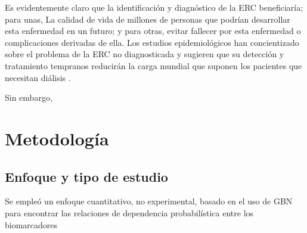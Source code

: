 \documentclass{Academic}
\begin{document}
Es evidentemente claro que la identificación y diagnóstico de la ERC beneficiaría; para unas, 
La calidad de vida de millones de personas que podrían desarrollar esta enfermedad en un 
futuro; y para otras, evitar fallecer por esta enfermedad o complicaciones derivadas de ella. 
Los estudios epidemiológicos han concientizado sobre el problema de la ERC no 
diagnosticada y sugieren que su detección y tratamiento tempranos reducirán
la carga mundial que suponen los pacientes que necesitan diálisis \cite{Taal}.

Sin embargo,


\section{Metodología}

\subsection{Enfoque y tipo de estudio}
Se empleó un enfoque cuantitativo, no experimental, basado en el uso de GBN para encontrar 
las relaciones de dependencia probabilística entre los biomarcadores
\end{document}
